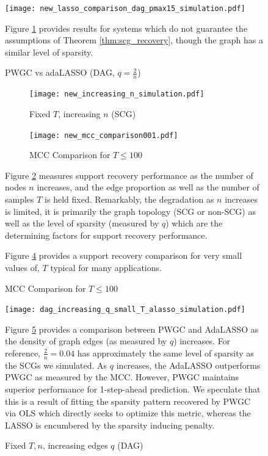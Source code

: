 \documentclass[12pt]{article}
\begin{document}
\begin{figure}
  \caption{PWGC vs adaLASSO (DAG, $q = \frac{2}{n}$)}
  \label{fig:simulation_results_comparison2}
  \texttt{[image: new\_lasso\_comparison\_dag\_pmax15\_simulation.pdf]}

  {\scriptsize Figure \ref{fig:simulation_results_comparison2}
    provides results for systems which do not guarantee the
    assumptions of Theorem \ref{thm:scg_recovery}, though the graph
    has a similar level of sparsity.}
\end{figure}

\begin{figure}
  \centering
  \caption{PWGC Scaling and Small Sample Performance}
  \label{fig:simulation_results_scaling_and_small_T}
  \begin{subfigure}[b]{0.45\textwidth}
    \caption{Fixed $T$, increasing $n$ (SCG)}
    \label{fig:simulation_results_scaling}
    \texttt{[image: new\_increasing\_n\_simulation.pdf]}
  \end{subfigure}
  \begin{subfigure}[b]{0.45\textwidth}
    \caption{MCC Comparison for $T \le 100$}
    \label{fig:small_T_comparison}
    \texttt{[image: new\_mcc\_comparison001.pdf]}
  \end{subfigure}

  {\scriptsize Figure \ref{fig:simulation_results_scaling} measures
    support recovery performance as the number of nodes $n$ increases,
    and the edge proportion as well as the number of samples $T$ is
    held fixed.  Remarkably, the degradation as $n$ increases is
    limited, it is primarily the graph topology (SCG or non-SCG) as
    well as the level of sparsity (measured by $q$) which are the
    determining factors for support recovery performance.

    Figure \ref{fig:small_T_comparison} provides a support recovery
    comparison for very small values of, $T$ typical for many
    applications.}
\end{figure}

\begin{figure}
  \caption{Fixed $T, n$, increasing edges $q$ (DAG)}
  \label{fig:simulation_results_dense}
  \texttt{[image: dag\_increasing\_q\_small\_T\_alasso\_simulation.pdf]}

  {\scriptsize Figure \ref{fig:simulation_results_dense} provides a
    comparison between PWGC and AdaLASSO as the density of graph edges
    (as measured by $q$) increases.  For reference,
    $\frac{2}{n} = 0.04$ has approximately the same level of sparsity
    as the SCGs we simulated.  As $q$ increases, the AdaLASSO
    outperforms PWGC as measured by the MCC.  However, PWGC maintains
    superior performance for 1-step-ahead prediction.  We speculate
    that this is a result of fitting the sparsity pattern recovered by
    PWGC via OLS which directly seeks to optimize this metric, whereas
    the LASSO is encumbered by the sparsity inducing penalty.}
\end{figure}
\end{document}
